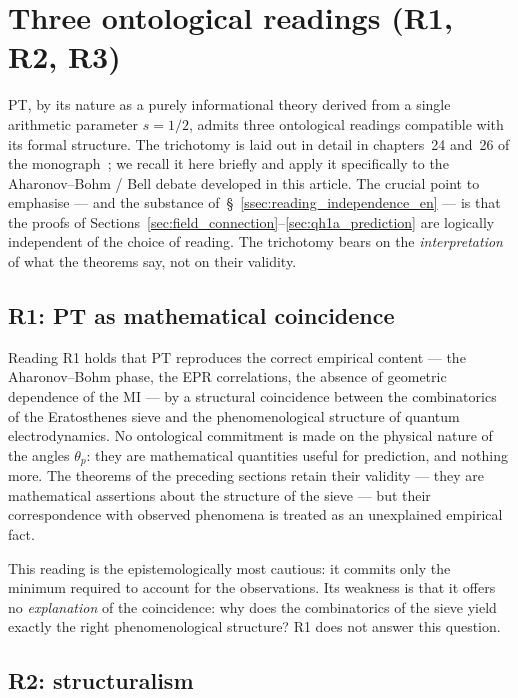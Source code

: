 \section{Three ontological readings (R1, R2, R3)}
\label{sec:ontological_readings_en}

PT, by its nature as a purely informational theory derived from
a single arithmetic parameter $s = 1/2$, admits three ontological
readings compatible with its formal structure. The trichotomy is
laid out in detail in chapters~24 and~26 of the
monograph~\cite{PT_Monograph}; we recall it here briefly and
apply it specifically to the Aharonov--Bohm / Bell debate
developed in this article. The crucial point to emphasise --- and
the substance of~\S~\ref{ssec:reading_independence_en} --- is
that the proofs of
Sections~\ref{sec:field_connection}--\ref{sec:qh1a_prediction}
are logically independent of the choice of reading. The
trichotomy bears on the \emph{interpretation} of what the
theorems say, not on their validity.

\subsection{R1: PT as mathematical coincidence}
\label{ssec:R1_en}

Reading R1 holds that PT reproduces the correct empirical content
--- the Aharonov--Bohm phase, the EPR correlations, the absence
of geometric dependence of the MI --- by a structural coincidence
between the combinatorics of the Eratosthenes sieve and the
phenomenological structure of quantum electrodynamics. No
ontological commitment is made on the physical nature of the
angles $\theta_p$: they are mathematical quantities useful for
prediction, and nothing more. The theorems of the preceding
sections retain their validity --- they are mathematical
assertions about the structure of the sieve --- but their
correspondence with observed phenomena is treated as an
unexplained empirical fact.

This reading is the epistemologically most cautious: it commits
only the minimum required to account for the observations. Its
weakness is that it offers no \emph{explanation} of the
coincidence: why does the combinatorics of the sieve yield
exactly the right phenomenological structure? R1 does not answer
this question.

\subsection{R2: structuralism}
\label{ssec:R2_en}

